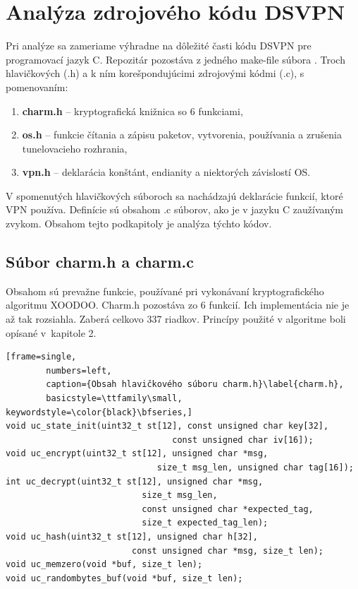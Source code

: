  
\section{Analýza zdrojového kódu DSVPN}
Pri analýze sa zameriame výhradne na dôležité časti kódu DSVPN pre programovací jazyk C. Repozitár pozostáva z jedného make-file súbora \cite{make}. Troch hlavičkových (.h) a k ním korešpondujúcimi zdrojovými kódmi (.c), s pomenovaním:
 \begin{enumerate}
 	\item \textbf{charm.h} -- kryptografická knižnica so 6 funkciami,
 	\item \textbf{os.h} -- funkcie čítania a zápisu paketov, vytvorenia, používania a zrušenia tunelovacieho rozhrania,
 	\item \textbf{vpn.h} -- deklarácia konštánt, endianity\cite{endianita} a niektorých závislostí OS.
 \end{enumerate}

V spomenutých hlavičkových súboroch sa nachádzajú deklarácie funkcií, ktoré VPN používa. Definície sú obsahom .c súborov, ako je v jazyku C zaužívaným zvykom. Obsahom tejto podkapitoly je analýza týchto kódov. 
 
\subsection{Súbor charm.h a charm.c}
Obsahom sú prevažne funkcie, používané pri vykonávaní kryptografického algoritmu XOODOO. Charm.h pozostáva zo 6 funkcií. Ich implementácia nie je až tak rozsiahla. Zaberá celkovo 337 riadkov. Princípy použité v algoritme boli opísané v~kapitole 2.  
 
   \begin{minipage}{\linewidth} 	
  	\begin{lstlisting}[frame=single,
  		numbers=left,
  		caption={Obsah hlavičkového súboru charm.h}\label{charm.h},
  		basicstyle=\ttfamily\small, keywordstyle=\color{black}\bfseries,]
void uc_state_init(uint32_t st[12], const unsigned char key[32], 
				  			 	 const unsigned char iv[16]);
void uc_encrypt(uint32_t st[12], unsigned char *msg, 
							  size_t msg_len, unsigned char tag[16]);	
int uc_decrypt(uint32_t st[12], unsigned char *msg, 
			   			   size_t msg_len,
			   			   const unsigned char *expected_tag, 
			   			   size_t expected_tag_len);
void uc_hash(uint32_t st[12], unsigned char h[32],
			 			 const unsigned char *msg, size_t len);
void uc_memzero(void *buf, size_t len);
void uc_randombytes_buf(void *buf, size_t len);
  		 	\end{lstlisting}
  	\end{minipage}\\
     
